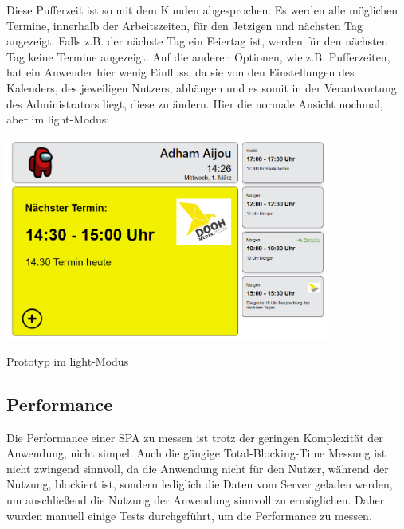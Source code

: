 Diese Pufferzeit ist so mit dem Kunden abgesprochen.
Es werden alle möglichen Termine, innerhalb der Arbeitszeiten, für den Jetzigen und nächsten Tag angezeigt.
Falls z.B. der nächste Tag ein Feiertag ist, werden für den nächsten Tag keine Termine angezeigt.
Auf die anderen Optionen, wie z.B. Pufferzeiten, hat ein Anwender hier wenig Einfluss, da sie von den Einstellungen des Kalenders, des jeweiligen Nutzers, abhängen und es somit in der Verantwortung des Administrators liegt, diese zu ändern.
\newline
\newline
Hier die normale Ansicht nochmal, aber im light-Modus:
\par\vspace{1cm}
    \centering
    \includegraphics[width=0.8\textwidth]{Bilder/Ergebnis_lightMode}
    \caption{Prototyp im light-Modus}
    \label{fig:PrototypLight}
\par\vspace{1cm}
\raggedright
\newline
\newline
\subsection{Performance}\label{subsec:performance}
Die Performance einer \gls{SPA} zu messen ist trotz der geringen Komplexität der Anwendung, nicht simpel.
Auch die gängige Total-Blocking-Time Messung ist nicht zwingend sinnvoll, da die Anwendung nicht für den Nutzer, während der Nutzung, blockiert ist, sondern lediglich die Daten vom Server geladen werden, um anschließend die Nutzung der Anwendung sinnvoll zu ermöglichen.
Daher wurden manuell einige Tests durchgeführt, um die Performance zu messen.
\newline
\newline
